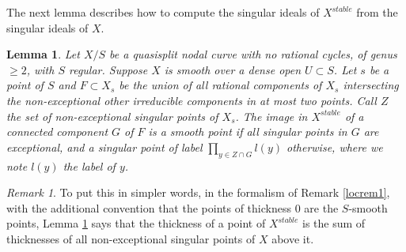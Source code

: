 \documentclass[a4paper,10pt,twoside]{article}
\newtheorem{lem}[thm]{Lemma}
\theoremstyle{definition}
\theoremstyle{remark}
\newtheorem{rem}{Remark}[thm]
\begin{document}
The next lemma describes how to compute the singular ideals of $X^{stable}$ from the singular ideals of $X$.


\begin{lem}\label{lemma stable model and merging of singularities}
Let $X/S$ be a quasisplit nodal curve with no rational cycles, of genus $\geq 2$, with $S$ regular. Suppose $X$ is smooth over a dense open $U\subset S$. Let $s$ be a point of $S$ and $F\subset X_s$ be the union of all rational components of $X_s$ intersecting the non-exceptional other irreducible components in at most two points. Call $Z$ the set of non-exceptional singular points of $X_s$. The image in $X^{stable}$ of a connected component $G$ of $F$ is a smooth point if all singular points in $G$ are exceptional, and a singular point of label $\prod\limits_{y\in Z\cap G}l(y)$ otherwise, where we note $l(y)$ the label of $y$.
\end{lem}

\begin{rem}
To put this in simpler words, in the formalism of Remark \ref{locrem1}, with the additional convention that the points of thickness $0$ are the $S$-smooth points, Lemma \ref{lemma stable model and merging of singularities} says that the thickness of a point of $X^{stable}$ is the sum of thicknesses of all non-exceptional singular points of $X$ above it.
\end{rem}
\end{document}
